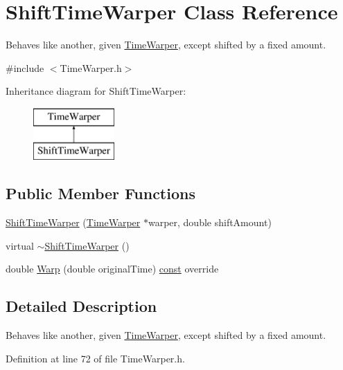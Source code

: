 \hypertarget{class_shift_time_warper}{}\section{Shift\+Time\+Warper Class Reference}
\label{class_shift_time_warper}


Behaves like another, given \hyperlink{class_time_warper}{Time\+Warper}, except shifted by a fixed amount.  




{\ttfamily \#include $<$Time\+Warper.\+h$>$}

Inheritance diagram for Shift\+Time\+Warper\+:\begin{figure}[H]
\begin{center}
\leavevmode
\includegraphics[height=2.000000cm]{class_shift_time_warper}
\end{center}
\end{figure}
\subsection*{Public Member Functions}
\begin{DoxyCompactItemize}
\item 
\hyperlink{class_shift_time_warper_aef3a512b098f7e0572264e7cac3dc43c}{Shift\+Time\+Warper} (\hyperlink{class_time_warper}{Time\+Warper} $\ast$warper, double shift\+Amount)
\item 
virtual \hyperlink{class_shift_time_warper_a9785a351df80a1cbe12e7c88758cd442}{$\sim$\+Shift\+Time\+Warper} ()
\item 
double \hyperlink{class_shift_time_warper_aa6a42aa3049c47ab5fb98001c4ccbf0c}{Warp} (double original\+Time) \hyperlink{getopt1_8c_a2c212835823e3c54a8ab6d95c652660e}{const}  override
\end{DoxyCompactItemize}


\subsection{Detailed Description}
Behaves like another, given \hyperlink{class_time_warper}{Time\+Warper}, except shifted by a fixed amount. 

Definition at line 72 of file Time\+Warper.\+h.



